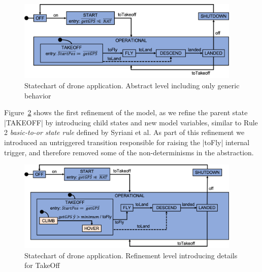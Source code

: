 \begin{figure}[!h]
	\vspace{-.4cm}
	\centering
	\includegraphics[width=0.95\textwidth]{figures/Picture1.png}
	\caption{Statechart of drone application. Abstract level including only generic behavior }
	\label{fig:drone1}
	\vspace{-.4cm}
\end{figure} 

Figure~\ref{fig:drone2} shows the first refinement of the model, as we refine the parent state |TAKEOFF|
by introducing child states and new model variables, similar to 
Rule 2 \emph{basic-to-or state rule} defined by Syriani et al.
As part of this refinement we introduced an untriggered transition responsible for 
raising the |toFly| internal trigger, and therefore removed some of the non-determinisms in the abstraction.

\begin{figure}[!h]
	\centering
	\includegraphics[width=0.95\textwidth]{figures/Picture2.png}
	\caption{Statechart of drone application. Refinement level introducing details for TakeOff}
	\label{fig:drone2}
\end{figure} 

